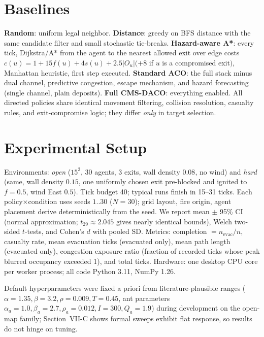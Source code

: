 \documentclass[conference]{IEEEtran}
\begin{document}
\section{Baselines}
\textbf{Random}: uniform legal neighbor. \textbf{Distance}: greedy on BFS distance with the same candidate filter and small stochastic tie-breaks. \textbf{Hazard-aware A*}: every tick, Dijkstra/A* from the agent to the nearest allowed exit over edge costs $c(u)=1+15f(u)+4s(u)+2.5|O_u|(+8$ if $u$ is a compromised exit$)$, Manhattan heuristic, first step executed. \textbf{Standard ACO}: the full stack minus dual channel, predictive congestion, escape mechanism, and hazard forecasting (single channel, plain deposits). \textbf{Full CMS-DACO}: everything enabled. All directed policies share identical movement filtering, collision resolution, casualty rules, and exit-compromise logic; they differ \emph{only} in target selection.

\section{Experimental Setup}
Environments: \emph{open} ($15^2$, 30 agents, 3 exits, wall density $0.08$, no wind) and \emph{hard} (same, wall density $0.15$, one uniformly chosen exit pre-blocked and ignited to $f{=}0.5$, wind East $0.5$). Tick budget 40; typical runs finish in 15--31 ticks. Each policy$\times$condition uses seeds $1..30$ ($N{=}30$); grid layout, fire origin, agent placement derive deterministically from the seed. We report mean $\pm$ 95\% CI (normal approximation; $t_{29}\approx2.045$ gives nearly identical bounds), Welch two-sided $t$-tests, and Cohen's $d$ with pooled SD. Metrics: completion $=n_{\text{evac}}/n$, casualty rate, mean evacuation ticks (evacuated only), mean path length (evacuated only), congestion exposure ratio (fraction of recorded ticks whose peak blurred occupancy exceeded 1), and total ticks. Hardware: one desktop CPU core per worker process; all code Python 3.11, NumPy 1.26.

Default hyperparameters were fixed a priori from literature-plausible ranges ($\alpha{=}1.35,\beta{=}3.2,\rho{=}0.009,T{=}0.45$, ant parameters $\alpha_a{=}1.0,\beta_a{=}2.7,\rho_a{=}0.012,I{=}300,Q_a{=}1.9$) during development on the open-map family; Section~VII-C shows formal sweeps exhibit flat response, so results do not hinge on tuning.
\end{document}

